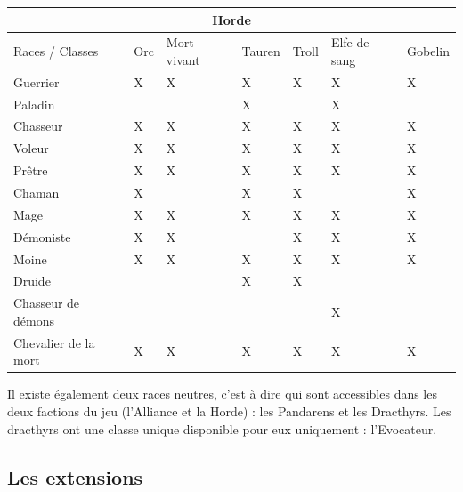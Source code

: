 \documentclass{article}
\begin{document}
\begin{tabular}{|m{2cm}||m{1cm}|m{1cm}|m{1cm}|m{1cm}|m{1cm}|m{1cm}|}
    \hline
    \multicolumn{7}{|c|}{Horde}                                                        \\
    \hline
    \hline
    Races / Classes      & Orc & Mort-vivant & Tauren & Troll & Elfe de sang & Gobelin \\
    \hline
    \hline
    Guerrier             & X   & X           & X      & X     & X            & X       \\
    \hline
    Paladin              &     &             & X      &       & X            &         \\
    \hline
    Chasseur             & X   & X           & X      & X     & X            & X       \\
    \hline
    Voleur               & X   & X           & X      & X     & X            & X       \\
    \hline
    Prêtre               & X   & X           & X      & X     & X            & X       \\
    \hline
    Chaman               & X   &             & X      & X     &              & X       \\
    \hline
    Mage                 & X   & X           & X      & X     & X            & X       \\
    \hline
    Démoniste            & X   & X           &        & X     & X            & X       \\
    \hline
    Moine                & X   & X           & X      & X     & X            & X       \\
    \hline
    Druide               &     &             & X      & X     &              &         \\
    \hline
    Chasseur de démons   &     &             &        &       & X            &         \\
    \hline
    Chevalier de la mort & X   & X           & X      & X     & X            & X       \\
    \hline
\end{tabular}\bigskip

Il existe également deux races neutres, c'est à dire qui sont accessibles dans les deux
factions du jeu (l'Alliance et la Horde) : les Pandarens et les Dracthyrs.\newline
Les dracthyrs ont une classe unique disponible pour eux uniquement : l'Evocateur.

\subsection{Les extensions}
\end{document}
